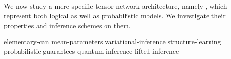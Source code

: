 \begin{partbacktext}
    \part{\ComputationActivationNetworks{}}

    We now study a more specific tensor network architecture, namely \ComputationActivationNetworks{}, which represent both logical as well as probabilistic models.
    We investigate their properties and inference schemes on them.

\end{partbacktext}

{elementary-can}
{mean-parameters}
{variational-inference}
{structure-learning}
{probabilistic-guarantees}
{quantum-inference}
{lifted-inference}
